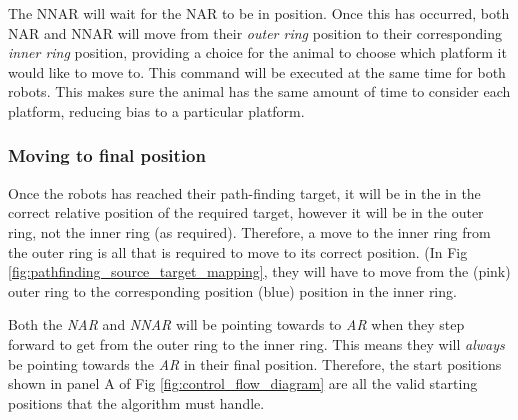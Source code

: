 The NNAR will wait for the NAR to be in position. Once this has occurred, both NAR and NNAR will move from their \textit{outer ring} position to their corresponding \textit{inner ring} position, providing a choice for the animal to choose which platform it would like to move to.
This command will be executed at the same time for both robots. This makes sure the animal has the same amount of time to consider each platform, reducing bias to a particular platform.


\subsubsection{Moving to final position}

Once the robots has reached their path-finding target, it will be in the in the correct relative position of the required target, however it will be in the outer ring, not the inner ring (as required). Therefore, a move to the inner ring from the outer ring is all that is required to move to its correct position. (In Fig \ref{fig:pathfinding_source_target_mapping}, they will have to move from the (pink) outer ring to the corresponding position (blue) position in the inner ring.




Both the \textit{NAR} and \textit{NNAR} will be pointing towards to \textit{AR} when they step forward to get from the outer ring to the inner ring. This means they will \textit{always} be pointing towards the \textit{AR} in their final position. Therefore, the start positions shown in panel A of Fig \ref{fig:control_flow_diagram} are all the valid starting positions that the algorithm must handle.

